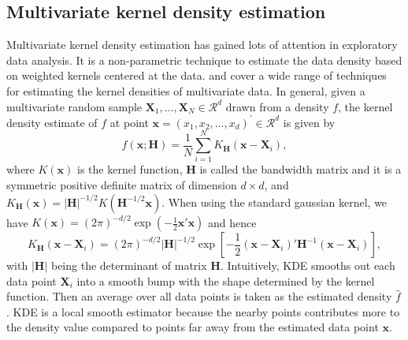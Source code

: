\documentclass[11pt,a4paper,]{article}
\begin{document}
\hypertarget{multivariate-kernel-density-estimation}{%
\subsection{Multivariate kernel density estimation}\label{multivariate-kernel-density-estimation}}

Multivariate kernel density estimation has gained lots of attention in exploratory data analysis. It is a non-parametric technique to estimate the data density based on weighted kernels centered at the data. \textcite{Scott1992-cj} and \textcite{Scott2015-vl} cover a wide range of techniques for estimating the kernel densities of multivariate data.
In general, given a multivariate random sample \(\pmb{X}_1, \dots, \pmb{X}_N \in \mathcal{R}^d\)
drawn from a density \(f\), the kernel density estimate of \(f\) at point \(\pmb{x}=(x_1, x_2, \dots, x_d)^\prime \in \mathcal{R}^d\) is given by
\begin{equation}
\label{eq:kde}
\hat{f}(\pmb{x};\pmb{H})=\frac{1}{N}\sum\limits_{i=1}^N K_{\pmb{H}}(\pmb{x}-\pmb{X}_i),
\end{equation}
where \(K(\pmb{x})\) is the kernel function, \(\pmb{H}\) is called the bandwidth matrix and it is a symmetric positive definite matrix of dimension \(d\times d\), and \(K_{\pmb{H}}(\pmb{x}) = |\pmb{H}|^{-1/2} K(\pmb{H}^{-1/2}\pmb{x})\).
When using the standard gaussian kernel, we have \(K(\pmb{x}) = (2\pi)^{-d/2}\exp(-\frac{1}{2}\pmb{x}'\pmb{x})\) and hence
\begin{equation}
\label{eq:kernel}
K_{\pmb{H}}(\pmb{x}-\pmb{X}_i)=(2\pi)^{-d/2}|\pmb{H}|^{-1/2}\exp\left[-\frac{1}{2}(\pmb{x}-\pmb{X}_i)'\pmb{H}^{-1}(\pmb{x}-\pmb{X}_i)\right],
\end{equation}
with \(|\pmb{H}|\) being the determinant of matrix \(\pmb{H}\).
Intuitively, KDE smooths out each data point \(\pmb{X}_i\) into a smooth bump with the shape determined by the kernel function. Then an average over all data points is taken as the estimated density \(\hat{f}\). KDE is a local smooth estimator because the nearby points contributes more to the density value compared to points far away from the estimated data point \(\pmb{x}\).
\end{document}
